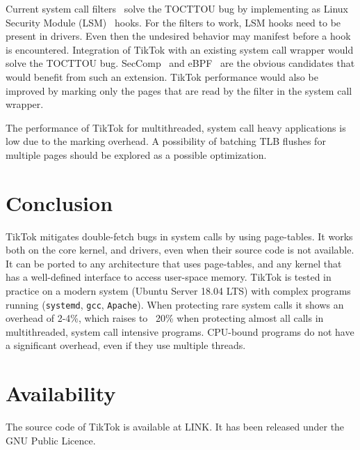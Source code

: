 \documentclass[conference]{IEEEtran}
\newcommand{\sysname}{TikTok}
\begin{document}
Current system call filters~\cite{landlock,krsi} solve the TOCTTOU bug by
implementing as Linux Security Module (LSM)~\cite{morris2002linux} hooks. For
the filters to work, LSM hooks need to be present in drivers. Even then the
undesired behavior may manifest before a hook is encountered. Integration of
\sysname{} with an existing system call wrapper would solve the TOCTTOU bug.
SecComp~\cite{seccomp} and eBPF~\cite{ebpf} are the obvious candidates that
would benefit from such an extension. \sysname{} performance would also be
improved by marking only the pages that are read by the filter in the system
call wrapper.

The performance of \sysname{} for multithreaded, system call heavy applications
is low due to the marking overhead. A possibility of batching TLB
flushes for multiple pages should be explored as a possible optimization.

\section{Conclusion}
\sysname{} mitigates double-fetch bugs in system calls by using page-tables. It
works both on the core kernel, and drivers, even when their source code is not
available. It can be ported to any architecture that uses page-tables, and any
kernel that has a well-defined interface to access user-space memory. \sysname{}
is tested in practice on a modern system (Ubuntu Server 18.04 LTS) with complex
programs running (\texttt{systemd}, \texttt{gcc}, \texttt{Apache}). When
protecting rare system calls it shows an overhead of 2-4\%, which raises to
~20\% when protecting almost all calls in multithreaded, system call intensive
programs. CPU-bound programs do not have a significant overhead, even if they
use multiple threads.

\section*{Availability}

The source code of TikTok is available at LINK. It has been released under the
GNU Public Licence.




\end{document}

